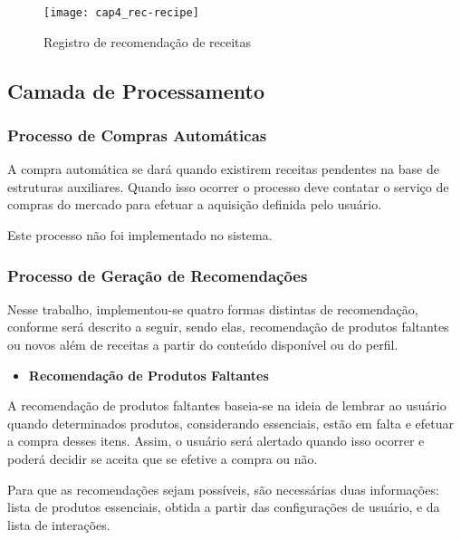 \begin{figure}[H]
    \caption{Registro de recomendação de receitas}
    \label{fig:cap4_rec-recipe}
    \texttt{[image: cap4\_rec-recipe]}
\end{figure}


\subsection{Camada de Processamento}


\subsubsection{Processo de Compras Automáticas}

A compra automática se dará quando existirem receitas pendentes na base de estruturas auxiliares. Quando isso ocorrer o processo deve contatar o serviço de compras do mercado para efetuar a aquisição definida pelo usuário.

Este processo não foi implementado no sistema.

\subsubsection{Processo de Geração de Recomendações}

Nesse trabalho, implementou-se quatro formas distintas de recomendação, conforme será descrito a seguir, sendo elas, recomendação de produtos faltantes ou novos além de receitas a partir do conteúdo disponível ou do perfil.

\begin{itemize}
    \item \textbf{Recomendação de Produtos Faltantes}
\end{itemize}

A recomendação de produtos faltantes baseia-se na ideia de lembrar ao usuário quando determinados produtos, considerando essenciais, estão em falta e efetuar a compra desses itens. Assim, o usuário será alertado quando isso ocorrer e poderá decidir se aceita que se efetive a compra ou não.

Para que as recomendações sejam possíveis, são necessárias duas informações: lista de produtos essenciais, obtida a partir das configurações de usuário, e da lista de interações. 

